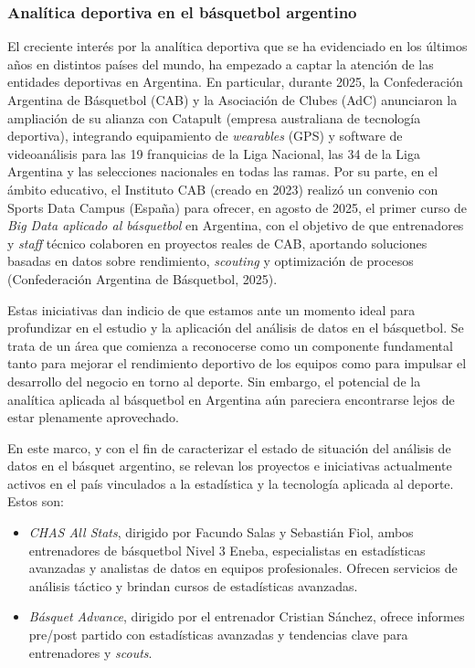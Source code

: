 \documentclass[
  12pt,
]{article}
\begin{document}
\subsubsection*{Analítica deportiva en el básquetbol
argentino}\label{analuxedtica-deportiva-en-el-buxe1squetbol-argentino}

El creciente interés por la analítica deportiva que se ha evidenciado en
los últimos años en distintos países del mundo, ha empezado a captar la
atención de las entidades deportivas en Argentina. En particular,
durante 2025, la Confederación Argentina de Básquetbol (CAB) y la
Asociación de Clubes (AdC) anunciaron la ampliación de su alianza con
Catapult (empresa australiana de tecnología deportiva), integrando
equipamiento de \emph{wearables} (GPS) y software de videoanálisis para
las 19 franquicias de la Liga Nacional, las 34 de la Liga Argentina y
las selecciones nacionales en todas las ramas. Por su parte, en el
ámbito educativo, el Instituto CAB (creado en 2023) realizó un convenio
con Sports Data Campus (España) para ofrecer, en agosto de 2025, el
primer curso de \emph{Big Data aplicado al básquetbol} en Argentina, con
el objetivo de que entrenadores y \emph{staff} técnico colaboren en
proyectos reales de CAB, aportando soluciones basadas en datos sobre
rendimiento, \emph{scouting} y optimización de procesos (Confederación
Argentina de Básquetbol, 2025).

Estas iniciativas dan indicio de que estamos ante un momento ideal para
profundizar en el estudio y la aplicación del análisis de datos en el
básquetbol. Se trata de un área que comienza a reconocerse como un
componente fundamental tanto para mejorar el rendimiento deportivo de
los equipos como para impulsar el desarrollo del negocio en torno al
deporte. Sin embargo, el potencial de la analítica aplicada al
básquetbol en Argentina aún pareciera encontrarse lejos de estar
plenamente aprovechado.

En este marco, y con el fin de caracterizar el estado de situación del
análisis de datos en el básquet argentino, se relevan los proyectos e
iniciativas actualmente activos en el país vinculados a la estadística y
la tecnología aplicada al deporte. Estos son:

\begin{itemize}
\item
  \emph{CHAS All Stats}, dirigido por Facundo Salas y Sebastián Fiol,
  ambos entrenadores de básquetbol Nivel 3 Eneba, especialistas en
  estadísticas avanzadas y analistas de datos en equipos profesionales.
  Ofrecen servicios de análisis táctico y brindan cursos de estadísticas
  avanzadas.
\item
  \emph{Básquet Advance}, dirigido por el entrenador Cristian Sánchez,
  ofrece informes pre/post partido con estadísticas avanzadas y
  tendencias clave para entrenadores y \emph{scouts}.
\end{itemize}
\end{document}
